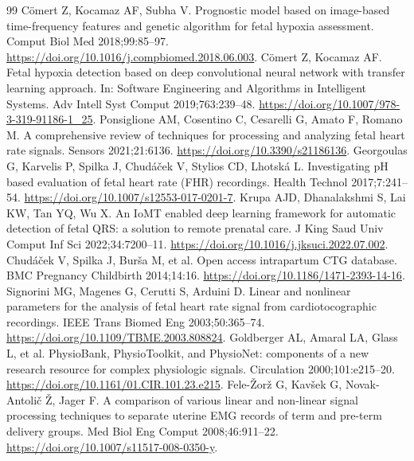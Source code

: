 \begin{thebibliography}{99}
 Cömert Z, Kocamaz AF, Subha V. Prognostic model based on image-based time-frequency features and genetic algorithm for fetal hypoxia assessment. Comput Biol Med 2018;99:85--97. \href{https://doi.org/10.1016/j.compbiomed.2018.06.003}{https://doi.org/10.1016/j.compbiomed.2018.06.003}.
 Cömert Z, Kocamaz AF. Fetal hypoxia detection based on deep convolutional neural network with transfer learning approach. In: Software Engineering and Algorithms in Intelligent Systems. Adv Intell Syst Comput 2019;763:239--48. \href{https://doi.org/10.1007/978-3-319-91186-1_25}{https://doi.org/10.1007/978-3-319-91186-1\_25}.
 Ponsiglione AM, Cosentino C, Cesarelli G, Amato F, Romano M. A comprehensive review of techniques for processing and analyzing fetal heart rate signals. Sensors 2021;21:6136. \href{https://doi.org/10.3390/s21186136}{https://doi.org/10.3390/s21186136}.
 Georgoulas G, Karvelis P, Spilka J, Chudáček V, Stylios CD, Lhotská L. Investigating pH based evaluation of fetal heart rate (FHR) recordings. Health Technol 2017;7:241--54. \href{https://doi.org/10.1007/s12553-017-0201-7}{https://doi.org/10.1007/s12553-017-0201-7}.
 Krupa AJD, Dhanalakshmi S, Lai KW, Tan YQ, Wu X. An IoMT enabled deep learning framework for automatic detection of fetal QRS: a solution to remote prenatal care. J King Saud Univ Comput Inf Sci 2022;34:7200--11. \href{https://doi.org/10.1016/j.jksuci.2022.07.002}{https://doi.org/10.1016/j.jksuci.2022.07.002}.
 Chudáček V, Spilka J, Burša M, et al. Open access intrapartum CTG database. BMC Pregnancy Childbirth 2014;14:16. \href{https://doi.org/10.1186/1471-2393-14-16}{https://doi.org/10.1186/1471-2393-14-16}.
 Signorini MG, Magenes G, Cerutti S, Arduini D. Linear and nonlinear parameters for the analysis of fetal heart rate signal from cardiotocographic recordings. IEEE Trans Biomed Eng 2003;50:365--74. \href{https://doi.org/10.1109/TBME.2003.808824}{https://doi.org/10.1109/TBME.2003.808824}.
 Goldberger AL, Amaral LA, Glass L, et al. PhysioBank, PhysioToolkit, and PhysioNet: components of a new research resource for complex physiologic signals. Circulation 2000;101:e215--20. \href{https://doi.org/10.1161/01.CIR.101.23.e215}{https://doi.org/10.1161/01.CIR.101.23.e215}.
 Fele-\v{Z}or\v{z} G, Kav\v{s}ek G, Novak-Antoli\v{c} \v{Z}, Jager F. A comparison of various linear and non-linear signal processing techniques to separate uterine EMG records of term and pre-term delivery groups. Med Biol Eng Comput 2008;46:911--22. \href{https://doi.org/10.1007/s11517-008-0350-y}{https://doi.org/10.1007/s11517-008-0350-y}.

\end{thebibliography}
